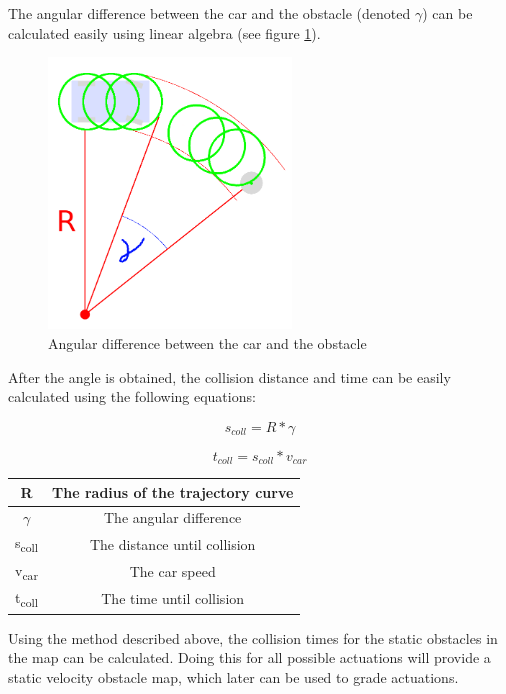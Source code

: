 The angular difference between the car and the obstacle (denoted $\gamma$) can be calculated easily using linear algebra (see figure \ref{static_collision_time_check_angle}).

\begin{figure}[!ht]
    \centering
    \includegraphics[height=72mm]{figures/raw/static_collision_time_check_angle.png}
    \caption{Angular difference between the car and the obstacle}
    \label{static_collision_time_check_angle}
\end{figure}

After the angle is obtained, the collision distance and time can be easily calculated using the following equations:

\[ s_{coll} = R * \gamma \]

\[ t_{coll} = s_{coll} * v_{car} \]

\begin{center}
    \begin{tabular}{ | c | c | }
        \hline
        R  						& The radius of the trajectory curve    \\
        \hline
        $\gamma$  				& The angular difference            	\\
        \hline
        s\textsubscript{coll}  	& The distance until collision         	\\
        \hline
        v\textsubscript{car}  	& The car speed         	    		\\
        \hline 
        t\textsubscript{coll}  	& The time until collision            	\\
        \hline
    \end{tabular}
\end{center}

Using the method described above, the collision times for the static obstacles in the map can be calculated. Doing this for all possible actuations will provide a static velocity obstacle map, which later can be used to grade actuations.

